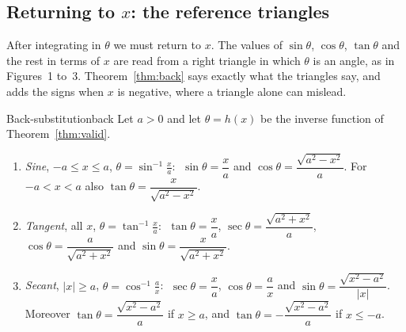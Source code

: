 \documentclass[11pt]{article}
\begin{document}
\subsection*{Returning to $x$: the reference triangles}

After integrating in $\theta$ we must return to $x$. The values of $\sin\theta$, $\cos\theta$, $\tan\theta$ and the rest in terms of $x$ are read from a right triangle in which $\theta$ is an angle, as in Figures~1 to~3. Theorem~\ref{thm:back} says exactly what the triangles say, and adds the signs when $x$ is negative, where a triangle alone can mislead.

\begin{thm}{Back-substitution}{back}
Let $a>0$ and let $\theta=h(x)$ be the inverse function of Theorem~\ref{thm:valid}.
\begin{enumerate}[label=(\arabic*)]
  \item \emph{Sine}, $-a\le x\le a$, $\theta=\sin^{-1}\frac xa$: $\;\sin\theta=\dfrac xa$ and $\cos\theta=\dfrac{\sqrt{a^2-x^2}}a$. For $-a<x<a$ also $\tan\theta=\dfrac x{\sqrt{a^2-x^2}}$.
  \item \emph{Tangent}, all $x$, $\theta=\tan^{-1}\frac xa$: $\;\tan\theta=\dfrac xa$, $\sec\theta=\dfrac{\sqrt{a^2+x^2}}a$, $\cos\theta=\dfrac a{\sqrt{a^2+x^2}}$ and $\sin\theta=\dfrac x{\sqrt{a^2+x^2}}$.
  \item \emph{Secant}, $\lvert x\rvert\ge a$, $\theta=\cos^{-1}\frac ax$: $\;\sec\theta=\dfrac xa$, $\cos\theta=\dfrac ax$ and $\sin\theta=\dfrac{\sqrt{x^2-a^2}}{\lvert x\rvert}$. Moreover $\tan\theta=\dfrac{\sqrt{x^2-a^2}}a$ if $x\ge a$, and $\tan\theta=-\dfrac{\sqrt{x^2-a^2}}a$ if $x\le-a$.
\end{enumerate}
\end{thm}
\end{document}

